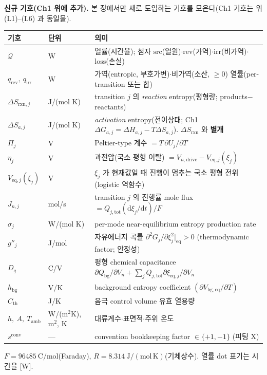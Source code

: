 \documentclass[11pt,a4paper]{article}
\newcommand{\dd}{\mathrm{d}}
\newcommand{\eq}{\mathrm{eq}}
\newcommand{\drive}{\mathrm{drive}}
\newcommand{\bg}{\mathrm{bg}}
\newcommand{\tot}{\mathrm{tot}}
\newcommand{\irr}{\mathrm{irr}}
\newcommand{\rev}{\mathrm{rev}}
\newcommand{\rxn}{\mathrm{rxn}}
\newcommand{\src}{\mathrm{src}}
\newcommand{\loss}{\mathrm{loss}}
\newcommand{\amb}{\mathrm{amb}}
\newcommand{\conv}{\mathrm{conv}}
\begin{document}
\textbf{신규 기호(Ch1 위에 추가).} 본 장에서만 새로 도입하는 기호를 모은다(Ch1 기호는 위 (L1)--(L6) 과 동일물).
\begin{longtable}{p{} p{} p{}}
\toprule 기호 & 단위 & 의미 \\ \midrule \endhead
$\dot{\mathcal Q}$ & W & 열률(시간율); 첨자 $\src$(열원)$\cdot$$\rev$(가역)$\cdot$$\irr$(비가역)$\cdot$$\loss$(손실) \\
$q_\rev,\ q_\irr$ & W & 가역(entropic, 부호가변)$\cdot$비가역(소산, $\ge0$) 열률(per-transition 또는 합) \\
$\Delta S_{\rxn,j}$ & J/(mol K) & transition $j$ 의 \emph{reaction} entropy(평형량; products$-$reactants) \\
$\Delta S_{a,j}$ & J/(mol K) & \emph{activation} entropy(전이상태; Ch1 $\Delta G_{a,j}=\Delta H_{a,j}-T\Delta S_{a,j}$). $\Delta S_{\rxn}$ 와 \textbf{별개} \\
$\Pi_j$ & V & Peltier-type 계수 $=T\,\partial U_j/\partial T$ \\
$\eta_j$ & V & 과전압(국소 평형 이탈) $=V_{n,\drive}-V_{\eq,j}(\xi_j)$ \\
$V_{\eq,j}(\xi_j)$ & V & $\xi_j$ 가 현재값일 때 진행이 멈추는 국소 평형 전위(logistic 역함수) \\
$J_{n,j}$ & mol/s & transition $j$ 의 진행률 mole flux $=Q_{j,\tot}(\dd\xi_j/\dd t)/F$ \\
$\sigma_j$ & W/(mol K) & per-mode near-equilibrium entropy production rate \\
$g''_j$ & J/mol & 자유에너지 곡률 $\partial^2 G_j/\partial\xi_j^2|_{\eq}>0$ (thermodynamic factor; 안정성) \\
$D_q$ & C/V & 평형 chemical capacitance $\partial Q_\bg/\partial V_n+\sum_jQ_{j,\tot}\partial\xi_{\eq,j}/\partial V_n$ \\
$h_\bg$ & V/K & background entropy coefficient $(\partial V_{\bg,\eq}/\partial T)$ \\
$C_{\mathrm{th}}$ & J/K & 음극 control volume 유효 열용량 \\
$h,\ A,\ T_\amb$ & W/(m$^2$K), m$^2$, K & 대류계수$\cdot$표면적$\cdot$주위 온도 \\
$s^{\conv}$ & --- & convention bookkeeping factor $\in\{+1,-1\}$ (피팅 X) \\
\bottomrule
\end{longtable}
$F=96485\ \mathrm{C/mol}$(Faraday), $R=8.314\ \mathrm{J/(mol\,K)}$(기체상수). 열률 dot 표기는 시간율 [W].

\end{document}

